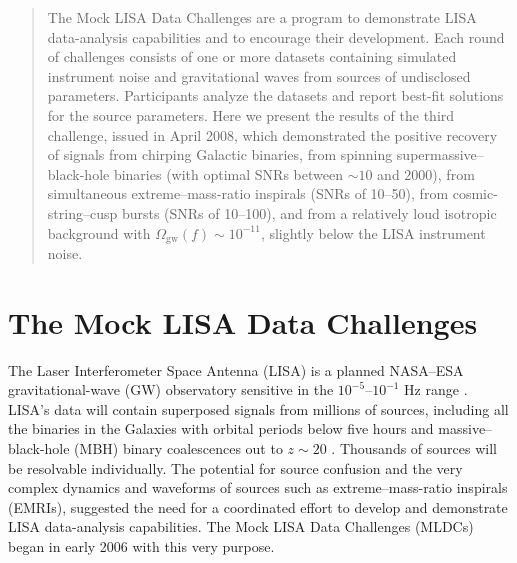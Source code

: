 \documentclass{iopart}
\begin{document}

\begin{abstract}
The Mock LISA Data Challenges are a program to demonstrate LISA data-analysis capabilities and to encourage their development. Each round of challenges consists of one or more datasets containing simulated instrument noise and gravitational waves from sources of undisclosed parameters. Participants analyze the datasets and report best-fit solutions for the source parameters. Here we present the results of the third challenge, issued in April 2008, which demonstrated the positive recovery of signals from chirping Galactic binaries, from spinning supermassive--black-hole binaries (with optimal SNRs between $\sim 10$ and $2000$), from simultaneous extreme--mass-ratio inspirals (SNRs of 10--50), from cosmic-string--cusp bursts (SNRs of 10--100), and from a relatively loud isotropic background with $\Omega_\mathrm{gw}(f) \sim 10^{-11}$, slightly below the LISA instrument noise.
\end{abstract}

\vspace{-18pt}


\section{The Mock LISA Data Challenges}

The Laser Interferometer Space Antenna (LISA) is a planned NASA--ESA gravitational-wave (GW) observatory sensitive in the $10^{-5}$--$10^{-1}$ Hz range \cite{lisa}. LISA's data will contain superposed signals from millions of sources, including all the binaries in the Galaxies with orbital periods below five hours and massive--black-hole (MBH) binary coalescences out to $z \sim 20$ \cite{baker2007}. Thousands of sources will be resolvable individually. The potential for source confusion and the very complex dynamics and waveforms of sources such as extreme--mass-ratio inspirals (EMRIs), suggested the need for a coordinated effort to develop and demonstrate LISA data-analysis capabilities. The Mock LISA Data Challenges (MLDCs) began in early 2006 with this very purpose.
\end{document}
